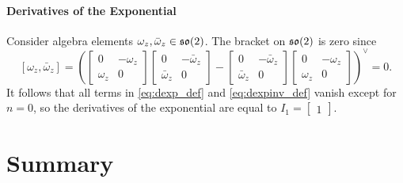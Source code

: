 \paragraph{Derivatives of the Exponential}

Consider algebra elements $\omega_z, \bar \omega_z \in {\mathfrak{so}(2)}$. The bracket on ${\mathfrak{so}(2)}$ is zero since
\begin{equation}
  \left[ \omega_z, \bar \omega_z \right] = \left( \begin{bmatrix}
      0 & -\omega_z \\ \omega_z & 0
    \end{bmatrix}\begin{bmatrix}
      0 & -\bar \omega_z \\ \bar \omega_z & 0
    \end{bmatrix} - \begin{bmatrix}
      0 & -\bar \omega_z \\ \bar \omega_z & 0
    \end{bmatrix}\begin{bmatrix}
      0 & - \omega_z \\ \omega_z & 0
    \end{bmatrix}\right)^\vee = 0.
\end{equation}
It follows that all terms in \eqref{eq:dexp_def} and \eqref{eq:dexpinv_def} vanish except for $n = 0$, so the derivatives of the exponential are equal to $I_{1} = \begin{bmatrix} 1 \end{bmatrix}$.

\section{Summary}

